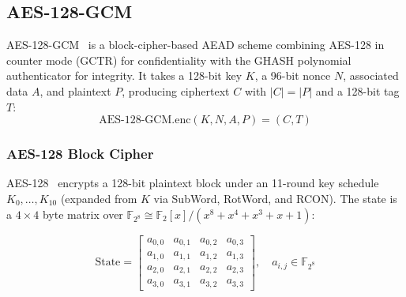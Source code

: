 \documentclass[11pt,a4paper]{article}
\newcommand{\F}{\mathbb{F}}
\begin{document}
\subsection{AES-128-GCM}

AES-128-GCM~\cite{nist_sp800_38d} is a block-cipher-based AEAD scheme combining AES-128 in counter mode (GCTR) for confidentiality with the GHASH polynomial authenticator for integrity. It takes a 128-bit key $K$, a 96-bit nonce $N$, associated data $A$, and plaintext $P$, producing ciphertext $C$ with $|C| = |P|$ and a 128-bit tag $T$:
\begin{equation}
\text{AES-128-GCM.enc}(K, N, A, P) = (C, T)
\end{equation}

\subsubsection{AES-128 Block Cipher}

AES-128~\cite{nist_sp800_38d} encrypts a 128-bit plaintext block under an 11-round key schedule $K_0,\ldots,K_{10}$ (expanded from $K$ via SubWord, RotWord, and RCON). The state is a $4 \times 4$ byte matrix over $\F_{2^8} \cong \F_2[x]/(x^8 + x^4 + x^3 + x + 1)$:

\begin{equation}
\text{State} = \begin{bmatrix} a_{0,0} & a_{0,1} & a_{0,2} & a_{0,3} \\ a_{1,0} & a_{1,1} & a_{1,2} & a_{1,3} \\ a_{2,0} & a_{2,1} & a_{2,2} & a_{2,3} \\ a_{3,0} & a_{3,1} & a_{3,2} & a_{3,3} \end{bmatrix}, \quad a_{i,j} \in \F_{2^8}
\end{equation}
\end{document}
